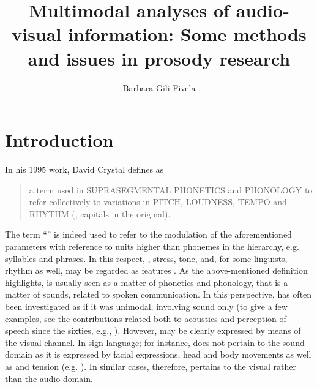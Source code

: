 \documentclass[output=paper]{langsci/langscibook}
\author{Barbara Gili Fivela\affiliation{University of Salento}}
\title{Multimodal analyses of audio-visual information: Some methods and issues in prosody research}
\begin{document}
 
\label{chap:gil}\label{ch:3}


\section{Introduction} \label{sec:gil:1}

In his 1995 work, David Crystal defines  as 

\begin{quote}
a term used in SUPRASEGMENTAL PHONETICS and PHONOLOGY to refer collectively to variations in PITCH, LOUDNESS, TEMPO and RHYTHM (\citealt{Crystal1995}; capitals in the original). 
\end{quote}

The term ``'' is indeed used to refer to the modulation of the aforementioned parameters with reference to units higher than phonemes in the  hierarchy, e.g. syllables and phrases. In this respect, , stress, tone, and, for some linguists, rhythm as well, may be regarded as  features \citep{Beccaria1994}. As the above-mentioned definition highlights,  is usually seen as a matter of phonetics and phonology, that is a matter of sounds, related to spoken communication. In this perspective,  has often been investigated as if it was unimodal, involving sound only (to give a few examples, see the contributions related both to acoustics and perception of speech since the sixties, e.g., \citealt{Lehiste1975,Lehiste1977}). However,  may be clearly expressed by means of the visual channel. In sign language; for instance,  does not pertain to the sound domain as it is expressed by facial expressions, head and body movements as well as  and tension (e.g. \citealt{Nespor1999,Wilbur2000,Sandler2005}). In similar cases, therefore,  pertains to the visual rather than the audio domain.
\end{document}
